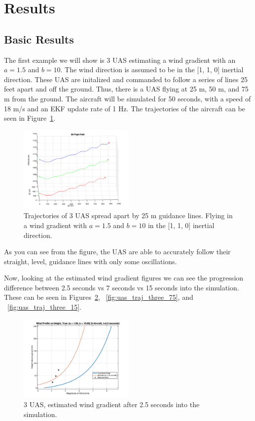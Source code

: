 \section{Results}

\subsection{Basic Results}

The first example we will show is 3 UAS estimating a wind gradient with an $a = 1.5$ and $b = 10$.
The wind direction is assumed to be in the [1, 1, 0] inertial direction.
These UAS are initalized and commanded to follow a series of lines 25 feet apart and off the ground.
Thus, there is a UAS flying at 25 m, 50 m, and 75 m from the ground.
The aircraft will be simulated for 50 seconds, with a speed of 18 m/s and an EKF update rate of 1 Hz.
The trajectories of the aircraft can be seen in Figure~\ref{fig:uas_traj_three}.

\begin{figure}[h]
    \centering
    \includegraphics[width=0.5\textwidth]{images/uas_traj_3.png}
    \caption{Trajectories of 3 UAS spread apart by 25 m guidance lines. Flying in a wind gradient with $a = 1.5$ and $b = 10$ in the [1, 1, 0] inertial direction.}
    \label{fig:uas_traj_three}
\end{figure}

As you can see from the figure, the UAS are able to accurately follow their straight, level, guidance lines with only some oscillations.

Now, looking at the estimated wind gradient figures we can see the progression difference between 2.5 seconds vs 7 seconds vs 15 seconds into the simulation.
These can be seen in Figures~\ref{fig:uas_traj_three_25}, ~\ref{fig:uas_traj_three_75}, and ~\ref{fig:uas_traj_three_15}.

\begin{figure}[h]
    \centering
    \includegraphics[width=0.5\textwidth]{images/3_uas_2.5_sec.png}
    \caption{3 UAS, estimated wind gradient after 2.5 seconds into the simulation.}
    \label{fig:uas_traj_three_25}
\end{figure}

